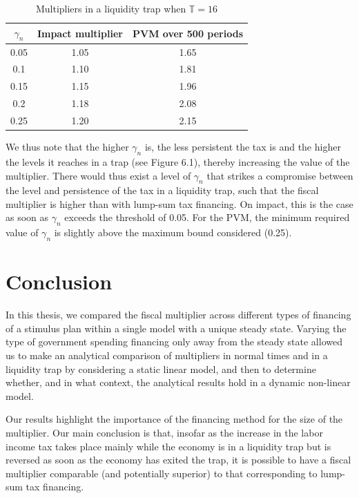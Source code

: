 \documentclass[12pt,letterpaper]{article}
\newcommand{\numtable}[2]{\renewcommand{\thetable}{#1}\caption{#2}\addtocounter{table}{-1}}
\newcommand{\T}{\mathbb{T}}
\begin{document}
\begin{table}[htbp]
\centering
\numtable{6.2}{Multipliers in a liquidity trap when $\T = 16$}
\begin{tabular}{ccc}
\toprule
$\gamma_n$ & Impact multiplier & PVM over 500 periods\\
\midrule
0.05 & 1.05 & 1.65\\
0.1 & 1.10 & 1.81\\
0.15 & 1.15 & 1.96\\
0.2 & 1.18 & 2.08\\
0.25 & 1.20 & 2.15\\
\bottomrule
\end{tabular}
\end{table}

We thus note that the higher $\gamma_n$ is, the less persistent the tax is and the higher the levels it reaches in a trap (see Figure 6.1), thereby increasing the value of the multiplier. There would thus exist a level of $\gamma_n$ that strikes a compromise between the level and persistence of the tax in a liquidity trap, such that the fiscal multiplier is higher than with lump-sum tax financing. On impact, this is the case as soon as $\gamma_n$ exceeds the threshold of 0.05. For the PVM, the minimum required value of $\gamma_n$ is slightly above the maximum bound considered (0.25).

\section{Conclusion}

In this thesis, we compared the fiscal multiplier across different types of financing of a stimulus plan within a single model with a unique steady state. Varying the type of government spending financing only away from the steady state allowed us to make an analytical comparison of multipliers in normal times and in a liquidity trap by considering a static linear model, and then to determine whether, and in what context, the analytical results hold in a dynamic non-linear model.

Our results highlight the importance of the financing method for the size of the multiplier. Our main conclusion is that, insofar as the increase in the labor income tax takes place mainly while the economy is in a liquidity trap but is reversed as soon as the economy has exited the trap, it is possible to have a fiscal multiplier comparable (and potentially superior) to that corresponding to lump-sum tax financing.
\end{document}
